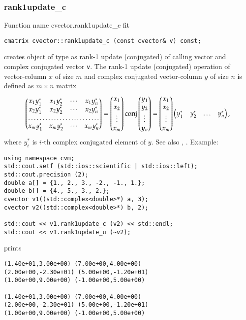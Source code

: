 \subsubsection{rank1update\_c}
Function%
\pdfdest name {cvector.rank1update_c} fit
\begin{verbatim}
cmatrix cvector::rank1update_c (const cvector& v) const;
\end{verbatim}
creates  object of type 
as  rank-1 update (conjugated) of
 calling vector and  complex conjugated vector \verb"v".
The rank-1 update (conjugated)
operation of  vector-column $x$ of  size $m$ and
 complex conjugated
vector-column $y$ of  size $n$ is defined as $m\times n$ matrix
\begin{equation*}
\begin{pmatrix}
x_1 y_1^* & x_1 y_2^* & \cdots & x_1 y_n^* \\
x_2 y_1^* & x_2 y_2^* & \cdots & x_2 y_n^* \\
\hdotsfor{4} \\
x_m y_1^* & x_m y_2^* & \cdots & x_m y_n^*
\end{pmatrix} =
\begin{pmatrix}
x_1 \\
x_2 \\
\vdots \\
x_m
\end{pmatrix}
\conj\begin{pmatrix}
y_1 \\ y_2 \\ \vdots \\ y_n
\end{pmatrix} =
\begin{pmatrix}
x_1 \\
x_2 \\
\vdots \\
x_m
\end{pmatrix}
\begin{pmatrix}
y_1^* & y_2^* & \hdots & y_n^*
\end{pmatrix},
\end{equation*}
where $y_i^*$ is \hbox{$i$-th} complex conjugated element of $y$.
See also , .
Example:
\begin{Verbatim}
using namespace cvm;
std::cout.setf (std::ios::scientific | std::ios::left);
std::cout.precision (2);
double a[] = {1., 2., 3., -2., -1., 1.};
double b[] = {4., 5., 3., 2.};
cvector v1((std::complex<double>*) a, 3);
cvector v2((std::complex<double>*) b, 2);

std::cout << v1.rank1update_c (v2) << std::endl;
std::cout << v1.rank1update_u (~v2);
\end{Verbatim}
prints
\begin{Verbatim}
(1.40e+01,3.00e+00) (7.00e+00,4.00e+00)
(2.00e+00,-2.30e+01) (5.00e+00,-1.20e+01)
(1.00e+00,9.00e+00) (-1.00e+00,5.00e+00)

(1.40e+01,3.00e+00) (7.00e+00,4.00e+00)
(2.00e+00,-2.30e+01) (5.00e+00,-1.20e+01)
(1.00e+00,9.00e+00) (-1.00e+00,5.00e+00)
\end{Verbatim}
\newpage




